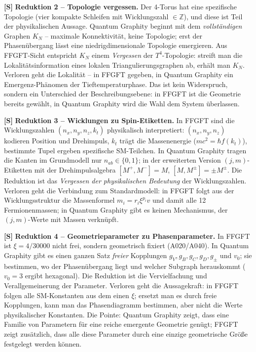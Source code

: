 \textbf{[S]} \textbf{Reduktion 2 -- Topologie vergessen.} Der 4-Torus hat eine
spezifische Topologie (vier kompakte Schleifen mit Wicklungszahl $\in\mathbb Z$),
und diese ist Teil der physikalischen Aussage. Quantum Graphity beginnt mit dem
\emph{vollständigen} Graphen $K_N$ -- maximale Konnektivität, keine Topologie;
erst der Phasenübergang lässt eine niedrigdimensionale Topologie emergieren. Aus
FFGFT-Sicht entspricht $K_N$ einem \emph{Vergessen} der $T^4$-Topologie: streift
man die Lokalitätsinformation eines lokalen Triangulierungsgraphen ab, erhält man
$K_N$. Verloren geht die Lokalität -- in FFGFT gegeben, in Quantum Graphity ein
Emergenz-Phänomen der Tieftemperaturphase. Das ist kein Widerspruch, sondern ein
Unterschied der Beschreibungsebene: in FFGFT ist die Geometrie bereits gewählt,
in Quantum Graphity wird die Wahl dem System überlassen.

\textbf{[S]} \textbf{Reduktion 3 -- Wicklungen zu Spin-Etiketten.} In FFGFT sind
die Wicklungszahlen $(n_x,n_y,n_z,k_t)$ physikalisch interpretiert:
$(n_x,n_y,n_z)$ kodieren Position und Drehimpuls, $k_t$ trägt die Massenenergie
($mc^2=\hbar f(k_t)$), bestimmte Tupel ergeben spezifische SM-Teilchen. In
Quantum Graphity tragen die Kanten im Grundmodell nur $n_{ab}\in\{0,1\}$; in der
erweiterten Version $(j,m)$-Etiketten mit der Drehimpulsalgebra
$[M^+,M^-]=M$, $[M,M^\pm]=\pm M^\pm$. Die Reduktion ist das \emph{Vergessen der
physikalischen Bedeutung} der Wicklungszahlen. Verloren geht die Verbindung zum
Standardmodell: in FFGFT folgt aus der Wicklungsstruktur die Massenformel
$m_i=r_i\xi^{p_i}v$ und damit alle 12 Fermionenmassen; in Quantum Graphity gibt
es keinen Mechanismus, der $(j,m)$-Werte mit Massen verknüpft.

\textbf{[S]} \textbf{Reduktion 4 -- Geometrieparameter zu Phasenparameter.} In
FFGFT ist $\xi = 4/30000$ nicht frei, sondern geometrisch fixiert (A020/A040). In
Quantum Graphity gibt es einen ganzen Satz \emph{freier} Kopplungen
$g_V,g_B,g_C,g_D,g_\pm$ und $v_0$; sie bestimmen, wo der Phasenübergang liegt und
welcher Subgraph herauskommt ($v_0=3$ ergibt hexagonal). Die Reduktion ist die
Vervielfachung und Verallgemeinerung der Parameter. Verloren geht die
Aussagekraft: in FFGFT folgen alle SM-Konstanten aus dem einen $\xi$; ersetzt man
es durch freie Kopplungen, kann man das Phasendiagramm bestimmen, aber nicht die
Werte physikalischer Konstanten. Die Pointe: Quantum Graphity zeigt, dass eine
Familie von Parametern für eine reiche emergente Geometrie genügt; FFGFT zeigt
zusätzlich, dass alle diese Parameter durch eine einzige geometrische Größe
festgelegt werden können.

